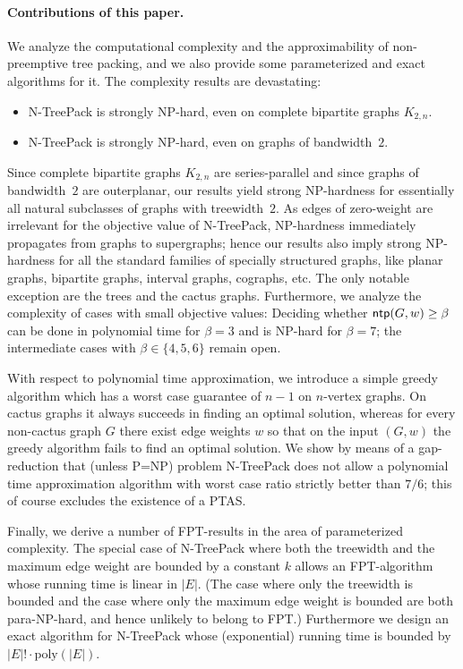 \documentclass[runningheads]{llncs}
\newcommand{\xxxNTP}{{\sc N-TreePack}}
\DeclareMathOperator{\ntp}{\text{\sf ntp}}
\begin{document}
\paragraph{Contributions of this paper.}
We analyze the computational complexity and the approximability of non-preemptive 
tree packing, and we also provide some parameterized and exact algorithms for it.
The complexity results are devastating:
\begin{itemize}
\item {\xxxNTP} is strongly NP-hard, even on complete bipartite graphs $K_{2,n}$. 
\item {\xxxNTP} is strongly NP-hard, even on graphs of bandwidth~$2$.
\end{itemize}
Since complete bipartite graphs $K_{2,n}$ are series-parallel and since graphs of 
bandwidth~$2$ are outerplanar, our results yield strong NP-hardness for essentially 
all natural subclasses of graphs with treewidth~$2$.
As edges of zero-weight are irrelevant for the objective value of {\xxxNTP}, NP-hardness 
immediately propagates from graphs to supergraphs; hence our results also imply 
strong NP-hardness for all the standard families of specially structured graphs, 
like planar graphs, bipartite graphs, interval graphs, cographs, etc.
The only notable exception are the trees and the cactus graphs.
Furthermore, we analyze the complexity of cases with small objective values:
Deciding whether $\ntp(G,w)\ge\beta$ can be done in polynomial time for $\beta=3$
and is NP-hard for $\beta=7$; the intermediate cases with $\beta\in\{4,5,6\}$ remain open.

With respect to polynomial time approximation, we introduce a simple greedy algorithm
which has a worst case guarantee of $n-1$ on $n$-vertex graphs.
On cactus graphs it always succeeds in finding an optimal solution, whereas for every 
non-cactus graph $G$ there exist edge weights $w$ so that on the input $(G,w)$ the 
greedy algorithm fails to find an optimal solution.
We show by means of a gap-reduction that (unless P=NP) problem {\xxxNTP} does not
allow a polynomial time approximation algorithm with worst case ratio strictly better
than $7/6$; this of course excludes the existence of a PTAS.

Finally, we derive a number of FPT-results in the area of parameterized complexity.
The special case of {\xxxNTP} where both the treewidth and the maximum edge weight are 
bounded by a constant $k$ allows an FPT-algorithm whose running time is linear in $|E|$.
(The case where only the treewidth is bounded and the case where only the maximum 
edge weight is bounded are both para-NP-hard, and hence unlikely to belong to FPT.)
Furthermore we design an exact algorithm for {\xxxNTP} whose (exponential) 
running time is bounded by $|E|!\cdot\text{poly}(|E|)$.
\end{document}
